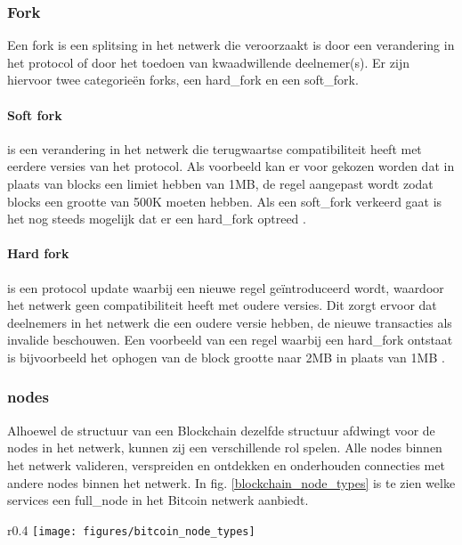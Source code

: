 \subsubsection{Fork}

Een \gls{fork} is een splitsing in het netwerk die veroorzaakt is door een verandering in het protocol of door het toedoen van kwaadwillende deelnemer(s). Er zijn hiervoor twee categorieën \glspl{fork}, een \gls{hard_fork} en een \gls{soft_fork}.

\paragraph{Soft fork}

is een verandering in het netwerk die terugwaartse compatibiliteit heeft met eerdere versies van het protocol. Als voorbeeld kan er voor gekozen worden dat in plaats van blocks een limiet hebben van 1MB, de regel aangepast wordt zodat blocks een grootte van 500K moeten hebben. Als een \gls{soft_fork} verkeerd gaat is het nog steeds mogelijk dat er een \gls{hard_fork} optreed \citep[Soft Fork]{coindesk:forks}.

\paragraph{Hard fork}

is een protocol update waarbij een nieuwe regel geïntroduceerd wordt, waardoor het netwerk geen compatibiliteit heeft met oudere versies. Dit zorgt ervoor dat deelnemers in het netwerk die een oudere versie hebben, de nieuwe transacties als invalide beschouwen. Een voorbeeld van een regel waarbij een \gls{hard_fork} ontstaat is bijvoorbeeld het ophogen van de block grootte naar 2MB in plaats van 1MB \citep[Hard Fork]{coindesk:forks}. 

\subsubsection{\Glspl{node}}

Alhoewel de structuur van een Blockchain dezelfde structuur afdwingt voor de \glspl{node} in het netwerk, kunnen zij een verschillende rol spelen. Alle \glspl{node} binnen het netwerk valideren, verspreiden en ontdekken en onderhouden connecties met andere \glspl{node} binnen het netwerk. In fig. \ref{blockchain_node_types} is te zien welke services een \gls{full_node} in het Bitcoin netwerk aanbiedt. 

\begin{wrapfigure}[14]{r}{0.4\textwidth}
  \texttt{[image: figures/bitcoin\_node\_types]}
  \caption[Bitcoin Node functionaliteiten] {
    Een bitcoin netwerk node die alle functies bevat: wallet, mining, blockchain database en netwerk routing, \citep[p.~172]{Antonopoulos:2014:MBU:2695500}.
  }
  \label{blockchain_node_types}
\end{wrapfigure}

